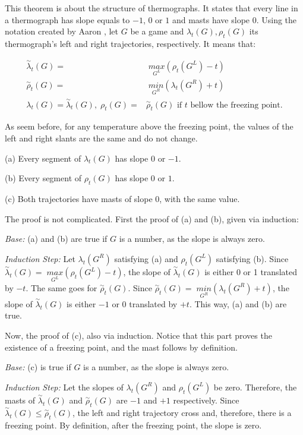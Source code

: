 This theorem is about the structure of thermographs. It states that every line in a thermograph has slope equals to ${-}1$, $0$ or $1$ and masts have slope 0. Using the notation created by Aaron \cite{CGT}, let $G$ be a game and $\lambda_t(G), \rho_t(G)$ its thermograph's left and right trajectories, respectively. It means that:

\begin{align*}
\overset{\sim}{\lambda}_t(G) =&\; \underset{G^L}{max}(\rho_t(G^L)- t)\\
\overset{\sim}{\rho}_t(G) =&\; \underset{G^R}{min}(\lambda_t(G^R) + t)\\
\lambda_t(G) = \overset{\sim}{\lambda}_t(G),\;\rho_t(G) =& \overset{\sim}{\rho}_t(G)\text{ if $t$ bellow the freezing point.}
\end{align*}

As seem before, for any temperature above the freezing point, the values of the left and right slants are the same and do not change. 

(a) Every segment of $\lambda_t(G)$ has slope 0 or ${-}1$.

(b) Every segment of $\rho_t(G)$ has slope 0 or $1$.

(c) Both trajectories have masts of slope 0, with the same value.

The proof is not complicated. First the proof of (a) and (b), given via induction:

\textit{Base:} (a) and (b) are true if $G$ is a number, as the slope is always zero.

\textit{Induction Step:} Let $\lambda_t(G^R)$ satisfying (a) and $\rho_t(G^L)$ satisfying (b). Since \mbox{$\overset{\sim}{\lambda}_t(G) =\; \underset{G^L}{max}(\rho_t(G^L)- t)$}, the slope of $\overset{\sim}{\lambda}_t(G)$ is either 0 or 1 translated by ${-}t$. The same goes for $\overset{\sim}{\rho}_t(G)$. Since \mbox{$\overset{\sim}{\rho}_t(G) =\; \underset{G^R}{min}(\lambda_t(G^R) + t)$}, the slope of $\overset{\sim}{\lambda}_t(G)$ is either ${-}1$ or 0 translated by ${+}t$. This way, (a) and (b) are true.

Now, the proof of (c), also via induction. Notice that this part proves the existence of a freezing point, and the mast follows by definition.

\textit{Base:} (c) is true if $G$ is a number, as the slope is always zero.

\textit{Induction Step:} Let the slopes of $\lambda_t(G^R)$ and $\rho_t(G^L)$ be zero. Therefore, the masts of $\overset{\sim}{\lambda}_t(G)$ and $\overset{\sim}{\rho}_t(G)$ are ${-}1$ and ${+}1$ respectively. Since $\overset{\sim}{\lambda}_t(G) \leq \overset{\sim}{\rho}_t(G)$, the left and right trajectory cross and, therefore, there is a freezing point. By definition, after the freezing point, the slope is zero.

